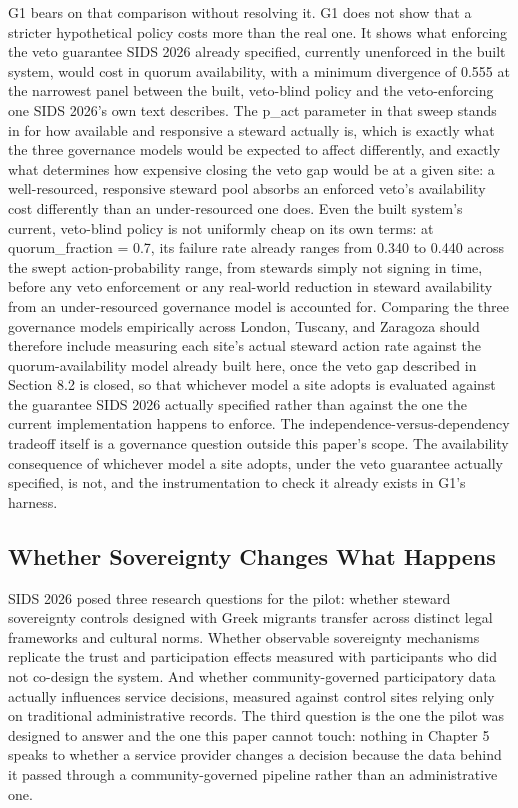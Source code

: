 G1 bears on that comparison without resolving it. G1 does not show that a stricter hypothetical policy costs more than the real one. It shows what enforcing the veto guarantee SIDS 2026 already specified, currently unenforced in the built system, would cost in quorum availability, with a minimum divergence of 0.555 at the narrowest panel between the built, veto-blind policy and the veto-enforcing one SIDS 2026's own text describes. The p\_act parameter in that sweep stands in for how available and responsive a steward actually is, which is exactly what the three governance models would be expected to affect differently, and exactly what determines how expensive closing the veto gap would be at a given site: a well-resourced, responsive steward pool absorbs an enforced veto's availability cost differently than an under-resourced one does. Even the built system's current, veto-blind policy is not uniformly cheap on its own terms: at quorum\_fraction = 0.7, its failure rate already ranges from 0.340 to 0.440 across the swept action-probability range, from stewards simply not signing in time, before any veto enforcement or any real-world reduction in steward availability from an under-resourced governance model is accounted for. Comparing the three governance models empirically across London, Tuscany, and Zaragoza should therefore include measuring each site's actual steward action rate against the quorum-availability model already built here, once the veto gap described in Section 8.2 is closed, so that whichever model a site adopts is evaluated against the guarantee SIDS 2026 actually specified rather than against the one the current implementation happens to enforce. The independence-versus-dependency tradeoff itself is a governance question outside this paper's scope. The availability consequence of whichever model a site adopts, under the veto guarantee actually specified, is not, and the instrumentation to check it already exists in G1's harness.

\subsection{Whether Sovereignty Changes What Happens}

SIDS 2026 posed three research questions for the pilot: whether steward sovereignty controls designed with Greek migrants transfer across distinct legal frameworks and cultural norms. Whether observable sovereignty mechanisms replicate the trust and participation effects measured with participants who did not co-design the system. And whether community-governed participatory data actually influences service decisions, measured against control sites relying only on traditional administrative records. The third question is the one the pilot was designed to answer and the one this paper cannot touch: nothing in Chapter 5 speaks to whether a service provider changes a decision because the data behind it passed through a community-governed pipeline rather than an administrative one.

